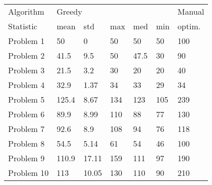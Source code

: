\begin{tabular}{lllllll}
\toprule
Algorithm & \multicolumn{5}{l}{Greedy} & Manual \\
Statistic &   mean &    std &  max &   med &  min & optim. \\
\midrule
Problem 1  &     50 &      0 &   50 &    50 &   50 &    100 \\
Problem 2  &   41.5 &    9.5 &   50 &  47.5 &   30 &     90 \\
Problem 3  &   21.5 &    3.2 &   30 &    20 &   20 &     40 \\
Problem 4  &   32.9 &   1.37 &   34 &    33 &   29 &     34 \\
Problem 5  &  125.4 &   8.67 &  134 &   123 &  105 &    239 \\
Problem 6  &   89.9 &   8.99 &  110 &    88 &   77 &    130 \\
Problem 7  &   92.6 &    8.9 &  108 &    94 &   76 &    118 \\
Problem 8  &   54.5 &   5.14 &   61 &    54 &   46 &    100 \\
Problem 9  &  110.9 &  17.11 &  159 &   111 &   97 &    190 \\
Problem 10 &    113 &  10.05 &  130 &   110 &   90 &    210 \\
\bottomrule
\end{tabular}
